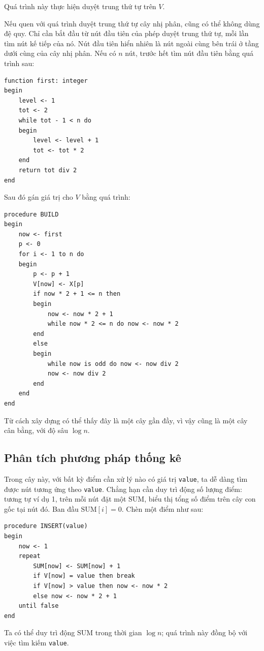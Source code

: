 \documentclass[11pt]{article}
\begin{document}
Quá trình này thực hiện duyệt trung thứ tự trên \(V\).

Nếu quen với quá trình duyệt trung thứ tự cây nhị phân, cũng có thể không dùng
đệ quy. Chỉ cần bắt đầu từ nút đầu tiên của phép duyệt trung thứ tự, mỗi lần
tìm nút kế tiếp của nó. Nút đầu tiên hiển nhiên là nút ngoài cùng bên trái ở
tầng dưới cùng của cây nhị phân. Nếu có \(n\) nút, trước hết tìm nút đầu tiên
bằng quá trình sau:

\begin{verbatim}
function first: integer
begin
    level <- 1
    tot <- 2
    while tot - 1 < n do
    begin
        level <- level + 1
        tot <- tot * 2
    end
    return tot div 2
end
\end{verbatim}

Sau đó gán giá trị cho \(V\) bằng quá trình:

\begin{verbatim}
procedure BUILD
begin
    now <- first
    p <- 0
    for i <- 1 to n do
    begin
        p <- p + 1
        V[now] <- X[p]
        if now * 2 + 1 <= n then
        begin
            now <- now * 2 + 1
            while now * 2 <= n do now <- now * 2
        end
        else
        begin
            while now is odd do now <- now div 2
            now <- now div 2
        end
    end
end
\end{verbatim}

Từ cách xây dựng có thể thấy đây là một cây gần đầy, vì vậy cũng là một cây
cân bằng, với độ sâu \(\log n\).

\subsection{Phân tích phương pháp thống kê}

Trong cây này, với bất kỳ điểm cần xử lý nào có giá trị \texttt{value}, ta dễ
dàng tìm được nút tương ứng theo \texttt{value}. Chẳng hạn cần duy trì động số
lượng điểm: tương tự ví dụ 1, trên mỗi nút đặt một \(\mathrm{SUM}\), biểu thị
tổng số điểm trên cây con gốc tại nút đó. Ban đầu \(\mathrm{SUM}[i]=0\). Chèn
một điểm như sau:

\begin{verbatim}
procedure INSERT(value)
begin
    now <- 1
    repeat
        SUM[now] <- SUM[now] + 1
        if V[now] = value then break
        if V[now] > value then now <- now * 2
        else now <- now * 2 + 1
    until false
end
\end{verbatim}

Ta có thể duy trì động \(\mathrm{SUM}\) trong thời gian \(\log n\); quá trình
này đồng bộ với việc tìm kiếm \texttt{value}.
\end{document}
